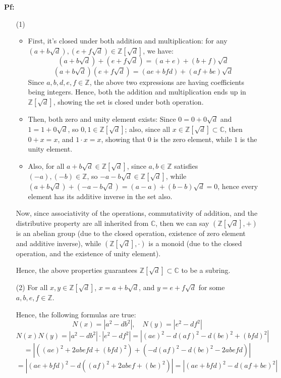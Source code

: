 \documentclass{article}
\begin{document}
\textbf{Pf:}

\begin{itemize}
    \item[(1)] \begin{itemize}
        \item First, it's closed under both addition and multiplication: for any $(a+b\sqrt{d}),(e+f\sqrt{d})\in \mathbb{Z}[\sqrt{d}]$, we have:
        $$(a+b\sqrt{d})+(e+f\sqrt{d})=(a+e)+(b+f)\sqrt{d}$$
        $$(a+b\sqrt{d})(e+f\sqrt{d})=(ae+bfd)+(af+be)\sqrt{d}$$
        Since $a,b,d,e,f\in\mathbb{Z}$, the above two expressions are having coefficients being integers. Hence, both the addition and multiplication ends up in $\mathbb{Z}[\sqrt{d}]$,
        showing the set is closed under both operation.

        \item Then, both zero and unity element exists: Since $0=0+0\sqrt{d}$ and $1=1+0\sqrt{d}$, so $0,1\in\mathbb{Z}[\sqrt{d}]$;
        also, since all $x\in \mathbb{Z}[\sqrt{d}]\subset\mathbb{C}$, then $0+x = x$, and $1\cdot x = x$, showing that $0$ is the zero element,
        while $1$ is the unity element.

        \item Also, for all $a+b\sqrt{d}\in\mathbb{Z}[\sqrt{d}]$, since $a,b\in\mathbb{Z}$ satisfies $(-a),(-b)\in\mathbb{Z}$, so $-a-b\sqrt{d}\in\mathbb{Z}[\sqrt{d}]$,
        while $(a+b\sqrt{d})+(-a-b\sqrt{d})=(a-a)+(b-b)\sqrt{d}=0$, hence every element has its additive inverse in the set also.
    \end{itemize}

    Now, since associativity of the operations, commutativity of addition, and the distributive property are all inherited from $\mathbb{C}$,
    then we can say $(\mathbb{Z}[\sqrt{d}],+)$ is an abelian group (due to the closed operation, existence of zero element and additive inverse),
    while $(\mathbb{Z}[\sqrt{d}],\cdot)$ is a monoid (due to the closed operation, and the existence of unity element).

    Hence, the above properties guarantees $\mathbb{Z}[\sqrt{d}]\subset \mathbb{C}$ to be a subring.

    \hfil

    \item[(2)] For all $x,y\in\mathbb{Z}[\sqrt{d}]$, $x=a+b\sqrt{d}$, and $y=e+f\sqrt{d}$ for some $a,b,e,f\in\mathbb{Z}$.
    
    Hence, the following formulas are true:
    $$N(x)=|a^2-db^2|,\quad N(y)=|e^2-df^2|$$
    $$N(x)N(y)=|a^2-db^2|\cdot|e^2-df^2| = |(ae)^2-d(af)^2-d(be)^2+(bfd)^2|$$
    $$= |((ae)^2+2abefd+(bfd)^2)+(-d(af)^2-d(be)^2-2abefd)|$$
    $$= |(ae+bfd)^2-d((af)^2+2abef+(be)^2)| = |(ae+bfd)^2-d(af+be)^2|$$


\end{itemize}
\end{document}
